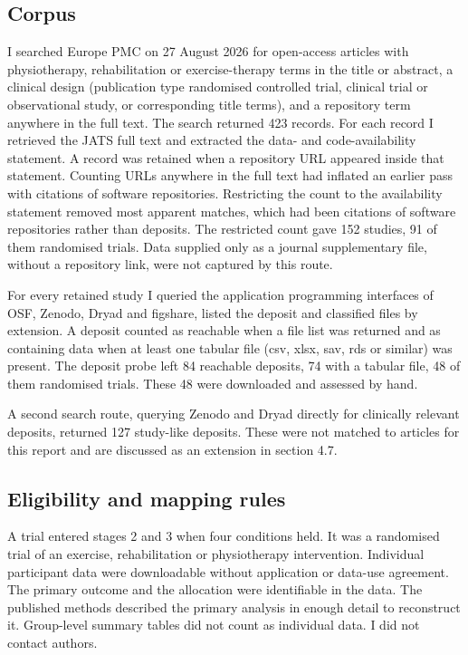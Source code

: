 \subsection{Corpus}\label{corpus}

I searched Europe PMC on 27 August 2026 for open-access articles with physiotherapy, rehabilitation or exercise-therapy terms in the title or abstract, a clinical design (publication type randomised controlled trial, clinical trial or observational study, or corresponding title terms), and a repository term anywhere in the full text. The search returned 423 records. For each record I retrieved the JATS full text and extracted the data- and code-availability statement. A record was retained when a repository URL appeared inside that statement. Counting URLs anywhere in the full text had inflated an earlier pass with citations of software repositories. Restricting the count to the availability statement removed most apparent matches, which had been citations of software repositories rather than deposits. The restricted count gave 152 studies, 91 of them randomised trials. Data supplied only as a journal supplementary file, without a repository link, were not captured by this route.

For every retained study I queried the application programming interfaces of OSF, Zenodo, Dryad and figshare, listed the deposit and classified files by extension. A deposit counted as reachable when a file list was returned and as containing data when at least one tabular file (csv, xlsx, sav, rds or similar) was present. The deposit probe left 84 reachable deposits, 74 with a tabular file, 48 of them randomised trials. These 48 were downloaded and assessed by hand.

A second search route, querying Zenodo and Dryad directly for clinically relevant deposits, returned 127 study-like deposits. These were not matched to articles for this report and are discussed as an extension in section 4.7.

\subsection{Eligibility and mapping rules}\label{eligibility-and-mapping-rules}

A trial entered stages 2 and 3 when four conditions held. It was a randomised trial of an exercise, rehabilitation or physiotherapy intervention. Individual participant data were downloadable without application or data-use agreement. The primary outcome and the allocation were identifiable in the data. The published methods described the primary analysis in enough detail to reconstruct it. Group-level summary tables did not count as individual data. I did not contact authors.

